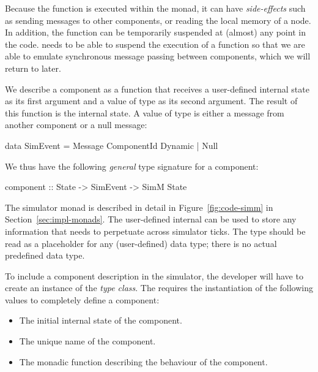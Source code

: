 Because the function is executed within the monad, it can have \emph{side-effects} such as sending messages to other components, or reading the local memory of a node.
In addition, the function can be temporarily suspended at (almost) any point in the code.
\soosim needs to be able to suspend the execution of a function so that we are able to emulate synchronous message passing between components, which we will return to later.

We describe a component as a function that receives a user-defined internal state as its first argument and a value of type  as its second argument.
The result of this function is the internal state.
A value of type  is either a message from another component or a null message:
\begin{code}
data SimEvent
  =  Message ComponentId Dynamic
  |  Null
\end{code}
We thus have the following \emph{general} type signature for a component:
\begin{code}
component :: State -> SimEvent -> SimM State
\end{code}

The simulator monad  is described in detail in
Figure~\ref{fig:code-simm} in
Section~\ref{sec:impl-monads}.
The user-defined internal  can be used to store any information that needs to perpetuate across simulator ticks.
The type  should be read as a placeholder for any (user-defined) data type; there is no actual predefined  data type.

To include a component description in the simulator, the developer will have to create an instance of the  \emph{type class}.
The  requires the instantiation of the following values to completely define a component:

\begin{itemize}
  \item The initial internal state of the component.
  \item The unique name of the component.
  \item The monadic function describing the behaviour of the component.
\end{itemize}

